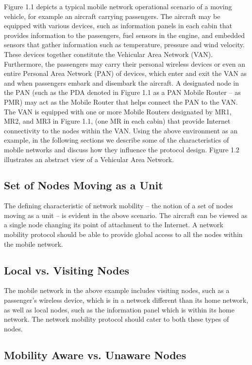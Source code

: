 Figure 1.1 depicts a typical mobile network operational scenario of a moving
vehicle, for example an aircraft carrying passengers. The aircraft may be
equipped with various devices, such as information panels in each cabin that
provides information to the passengers, fuel sensors in the engine, and
embedded sensors that gather information such as temperature, pressure and
wind velocity. These devices together constitute the Vehicular Area Network
(VAN). Furthermore, the passengers may carry their personal wireless devices
or even an entire Personal Area Network (PAN) of devices, which enter and exit
the VAN as and when passengers embark and disembark the aircraft. A designated
node in the PAN (such as the PDA denoted in Figure 1.1 as a PAN Mobile Router --
as PMR) may act as the Mobile Router that helps connect the PAN to the VAN.
The VAN is equipped with one or more Mobile Routers designated by MR1, MR2,
and MR3 in Figure 1.1, (one MR in each cabin) that provide Internet connectivity
to the nodes within the VAN. Using the above environment as an example, in the
following sections we describe some of the characteristics of mobile networks
and discuss how they influence the protocol design. Figure 1.2 illustrates an
abstract view of a Vehicular Area Network.

\subsection{Set of Nodes Moving as a Unit}

The defining characteristic of network mobility -- the notion of a set of
nodes moving as a unit -- is evident in the above scenario. The aircraft can
be viewed as a single node changing its point of attachment to the Internet. A
network mobility protocol should be able to provide global access to all the
nodes within the mobile network.

\subsection{Local vs. Visiting Nodes}

The mobile network in the above example includes visiting nodes, such as a
passenger's wireless device, which is in a network different than its home
network, as well as local nodes, such as the information panel which is within
its home network. The network mobility protocol should cater to both these
types of nodes.

\subsection{Mobility Aware vs. Unaware Nodes}

